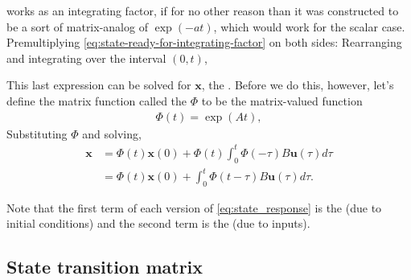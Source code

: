 \documentclass[dynamic_systems.tex]{subfiles}
\begin{document}
works as an integrating factor, if for no other reason than it was constructed to be a sort of matrix-analog of $\exp(-a t)$, which would work for the scalar case.
Premultiplying \eqref{eq:state-ready-for-integrating-factor} on both sides:
\tags{}
Rearranging and integrating over the interval $(0,t)$,

This last expression can be solved for $\bm{x}$, the .
Before we do this, however, let's define the matrix function called the  $\Phi$ to be the matrix-valued function
\tags{}
\begin{align}\label{eq:state_transition_matrix}
	\Phi(t) = \exp(A t),
\end{align}
Substituting $\Phi$ and solving,
\begin{subequations}\label{eq:state_response}
\begin{align}
	\bm{x} &= \Phi(t) \bm{x}(0) + \Phi(t) \int_0^t \Phi(-\tau) B \bm{u}(\tau) d\tau \\
	&= \Phi(t) \bm{x}(0) + \int_0^t \Phi(t - \tau) B \bm{u}(\tau) d\tau.
\end{align}
\end{subequations}

Note that the first term of each version of \autoref{eq:state_response} is the  (due to initial conditions) and the second term is the  (due to inputs).
\tags{}

\subsection{State transition matrix}
\tags{}
\label{sec:state_transition_matrix}
\end{document}

